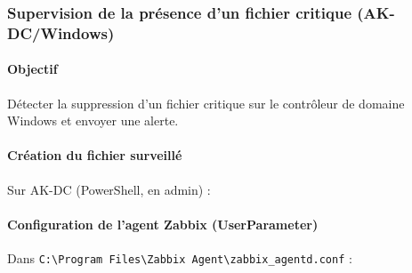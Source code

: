 \begin{Shaded}
\begin{Highlighting}[]
\end{Highlighting}
\end{Shaded}

\subsubsection{Supervision de la présence d'un fichier critique
(AK-DC/Windows)}\label{supervision-de-la-pruxe9sence-dun-fichier-critique-ak-dcwindows}

\paragraph{Objectif}\label{objectif-1}

Détecter la suppression d'un fichier critique sur le contrôleur de
domaine Windows et envoyer une alerte.

\paragraph{Création du fichier
surveillé}\label{cruxe9ation-du-fichier-surveilluxe9}

Sur AK-DC (PowerShell, en admin) :

\begin{Shaded}
\begin{Highlighting}[]
 \OperatorTok{{-}}\OperatorTok{{-}} \OperatorTok{{-}}
 \OperatorTok{{-}}\OperatorTok{{-}}\NormalTok{ \textasciigrave{}}
    \OperatorTok{{-}}
\end{Highlighting}
\end{Shaded}

\paragraph{Configuration de l'agent Zabbix
(UserParameter)}\label{configuration-de-lagent-zabbix-userparameter}

Dans
\texttt{C:\textbackslash{}Program\ Files\textbackslash{}Zabbix\ Agent\textbackslash{}zabbix\_agentd.conf}
:

